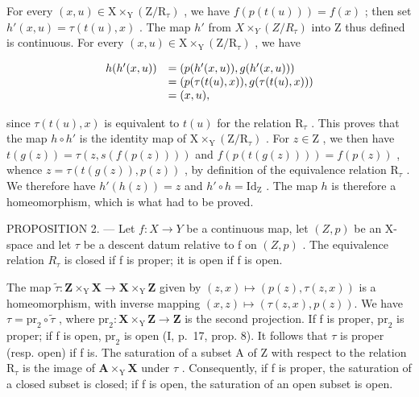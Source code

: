 For every \((x,u)\in\mathrm{X}\times_{\mathrm{Y}}(\mathrm{Z}/\mathrm{R}_{\tau})\) , we have \(f(p(t(u)))=f(x)\) ; then set \(h'(x,u)=\tau(t(u),x)\) . The map \(h'\) from \(X\times_{Y}(Z/R_{\tau})\) into Z thus defined is continuous. For every \((x,u)\in\mathrm{X}\times_{\mathrm{Y}}(\mathrm{Z}/\mathrm{R}_{\tau})\) , we have

\[
\begin{array}{r l} h (h ^ {\prime} (x, u)) & = (p (h ^ {\prime} (x, u)), g (h ^ {\prime} (x, u))) \\ & = (p (\tau (t (u), x)), g (\tau (t (u), x))) \\ & = (x, u), \end{array}
\]

since \(\tau(t(u), x)\) is equivalent to \(t(u)\) for the relation \(\mathrm{R}_{\tau}\) . This proves that the map \(h \circ h'\) is the identity map of \(\mathrm{X} \times_{\mathrm{Y}} (\mathrm{Z}/\mathrm{R}_{\tau})\) . For \(z \in \mathrm{Z}\) , we then have \(t(g(z)) = \tau(z, s(f(p(z))))\) and \(f(p(t(g(z)))) = f(p(z))\) , whence \(z = \tau(t(g(z)), p(z))\) , by definition of the equivalence relation \(\mathrm{R}_{\tau}\) . We therefore have \(h'(h(z)) = z\) and \(h' \circ h = \mathrm{Id}_{\mathrm{Z}}\) . The map \(h\) is therefore a homeomorphism, which is what had to be proved.

PROPOSITION 2. --- Let \(f\colon X \to Y\) be a continuous map, let \((Z,p)\) be an X-space and let \(\tau\) be a descent datum relative to f on \((Z,p)\) . The equivalence relation \(R_{\tau}\) is closed if f is proper; it is open if f is open.

The map \(\widetilde{\tau}\colon\mathbf{Z}\times_{\mathrm{Y}}\mathbf{X}\to\mathbf{X}\times_{\mathrm{Y}}\mathbf{Z}\) given by \((z,x)\mapsto(p(z),\tau(z,x))\) is a homeomorphism, with inverse mapping \((x,z)\mapsto(\tau(z,x),p(z)).\) We have \(\tau=\mathrm{pr}_{2}\circ\widetilde{\tau}\) , where \(\mathrm{pr}_{2}\colon\mathbf{X}\times_{\mathrm{Y}}\mathbf{Z}\to\mathbf{Z}\) is the second projection. If f is proper, \(\mathrm{pr}_{2}\) is proper; if f is open, \(\mathrm{pr}_{2}\) is open (I, p.~17, prop. 8). It follows that \(\tau\) is proper (resp. open) if f is. The saturation of a subset A of Z with respect to the relation \(\mathrm{R}_{\tau}\) is the image of \(\mathbf{A}\times_{\mathrm{Y}}\mathbf{X}\) under \(\tau\) . Consequently, if f is proper, the saturation of a closed subset is closed; if f is open, the saturation of an open subset is open.

